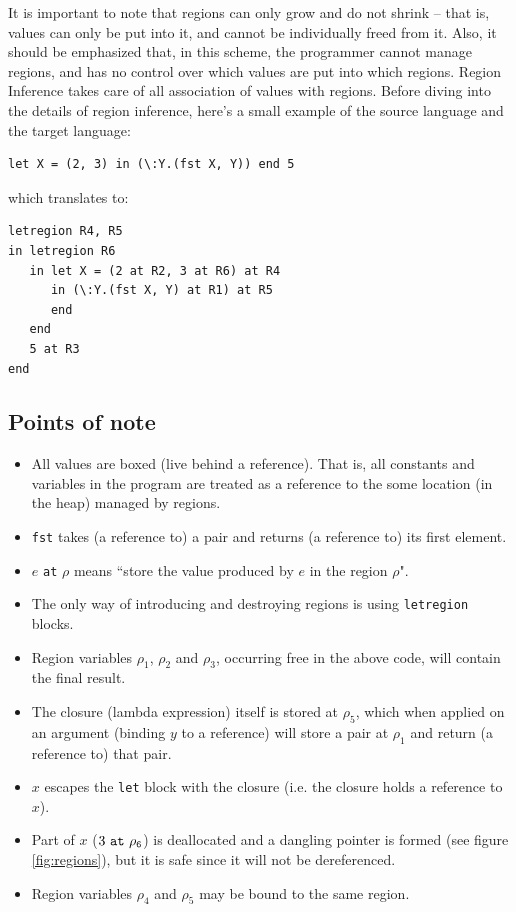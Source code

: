 \documentclass[11pt]{report}
\begin{document}
It is important to note that regions can only grow and do not shrink -- that is, values can only be put into it, and cannot be individually freed from it. Also, it should be emphasized that, in this scheme, the programmer cannot manage regions, and has no control over which values are put into which regions. Region Inference takes care of all association of values with regions. Before diving into the details of region inference, here’s a small example of the source language and the target language:

\begin{lstlisting}
let X = (2, 3) in (\:Y.(fst X, Y)) end 5
\end{lstlisting}

\noindent which translates to:

\begin{lstlisting}
letregion R4, R5
in letregion R6
   in let X = (2 at R2, 3 at R6) at R4
      in (\:Y.(fst X, Y) at R1) at R5
      end
   end
   5 at R3
end
\end{lstlisting}

\subsection*{Points of note}

\begin{itemize}
\item All values are boxed (live behind a reference). That is, all constants and variables in the program are treated as a reference to the some location (in the heap) managed by regions.
\item \texttt{fst} takes (a reference to) a pair and returns (a reference to) its first element.
\item $e$ \texttt{at} $\rho$ means ``store the value produced by $e$ in the region $\rho$".
\item The only way of introducing and destroying regions is using \texttt{letregion} blocks.
\item Region variables $\rho_1$, $\rho_2$ and $\rho_3$, occurring free in the above code, will contain the final result.
\item The closure (lambda expression) itself is stored at $\rho_5$, which when applied on an argument (binding $y$ to a reference) will store a pair at $\rho_1$ and return (a reference to) that pair.
\item $x$ escapes the \texttt{let} block with the closure (i.e. the closure holds a reference to $x$).
\item Part of $x$ ($3\tt~at~\rho_6$) is deallocated and a dangling pointer is formed (see figure \ref{fig:regions}), but it is safe since it will not be dereferenced.
\item Region variables $\rho_4$ and $\rho_5$ may be bound to the same region.
\end{itemize}
\end{document}
